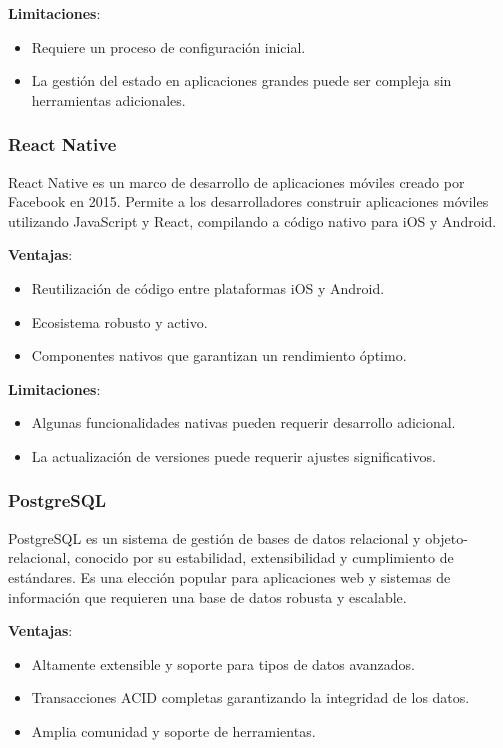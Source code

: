 \textbf{Limitaciones}:
\begin{itemize}
  \item Requiere un proceso de configuración inicial.
  \item La gestión del estado en aplicaciones grandes puede ser compleja sin herramientas adicionales.
\end{itemize}

\subsubsection{React Native}

React Native es un marco de desarrollo de aplicaciones móviles creado por Facebook en 2015. Permite a los desarrolladores construir aplicaciones móviles utilizando JavaScript y React, compilando a código nativo para iOS y Android.

\textbf{Ventajas}:
\begin{itemize}
  \item Reutilización de código entre plataformas iOS y Android.
  \item Ecosistema robusto y activo.
  \item Componentes nativos que garantizan un rendimiento óptimo.
\end{itemize}

\textbf{Limitaciones}:
\begin{itemize}
  \item Algunas funcionalidades nativas pueden requerir desarrollo adicional.
  \item La actualización de versiones puede requerir ajustes significativos.
\end{itemize}

\subsubsection{PostgreSQL}

PostgreSQL es un sistema de gestión de bases de datos relacional y objeto-relacional, conocido por su estabilidad, extensibilidad y cumplimiento de estándares. Es una elección popular para aplicaciones web y sistemas de información que requieren una base de datos robusta y escalable.

\textbf{Ventajas}:
\begin{itemize}
  \item Altamente extensible y soporte para tipos de datos avanzados.
  \item Transacciones ACID completas garantizando la integridad de los datos.
  \item Amplia comunidad y soporte de herramientas.
\end{itemize}


